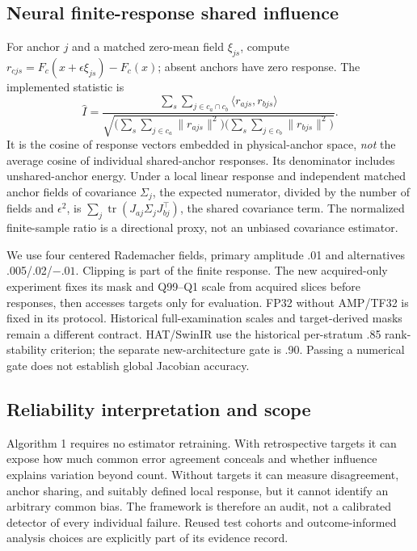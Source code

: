\documentclass[10pt,twocolumn,letterpaper]{article}
\begin{document}
\subsection{Neural finite-response shared influence}
For anchor $j$ and a matched zero-mean field $\xi_{js}$, compute $r_{cjs}=F_c(x+\epsilon\xi_{js})-F_c(x)$; absent anchors have zero response. The implemented statistic is
\begin{equation}
\widehat I=
\frac{\sum_s\sum_{j\in c_a\cap c_b}\langle r_{ajs},r_{bjs}\rangle}
{\sqrt{\bigl(\sum_s\sum_{j\in c_a}\|r_{ajs}\|^2\bigr)
\bigl(\sum_s\sum_{j\in c_b}\|r_{bjs}\|^2\bigr)}}.\label{eq:influence}
\end{equation}
It is the cosine of response vectors embedded in physical-anchor space, \emph{not} the average cosine of individual shared-anchor responses. Its denominator includes unshared-anchor energy. Under a local linear response and independent matched anchor fields of covariance $\Sigma_j$, the expected numerator, divided by the number of fields and $\epsilon^2$, is $\sum_j\operatorname{tr}(J_{aj}\Sigma_jJ_{bj}^\top)$, the shared covariance term. The normalized finite-sample ratio is a directional proxy, not an unbiased covariance estimator.

We use four centered Rademacher fields, primary amplitude .01 and alternatives .005/.02/$-.01$. Clipping is part of the finite response. The new acquired-only experiment fixes its mask and Q99--Q1 scale from acquired slices before responses, then accesses targets only for evaluation. FP32 without AMP/TF32 is fixed in its protocol. Historical full-examination scales and target-derived masks remain a different contract. HAT/SwinIR use the historical per-stratum .85 rank-stability criterion; the separate new-architecture gate is .90. Passing a numerical gate does not establish global Jacobian accuracy.

\subsection{Reliability interpretation and scope}
Algorithm 1 requires no estimator retraining. With retrospective targets it can expose how much common error agreement conceals and whether influence explains variation beyond count. Without targets it can measure disagreement, anchor sharing, and suitably defined local response, but it cannot identify an arbitrary common bias. The framework is therefore an audit, not a calibrated detector of every individual failure. Reused test cohorts and outcome-informed analysis choices are explicitly part of its evidence record.
\end{document}
